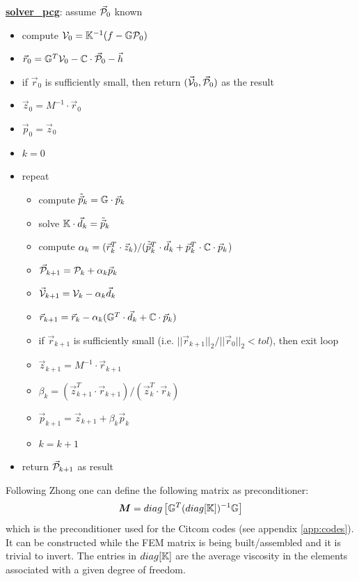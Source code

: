 \begin{mdframed}[backgroundcolor=blue!5]
\underline{\bf solver\_pcg}: assume $\vec{\cal P}_0$ known
\begin{itemize}
\item compute ${\cal V}_0={\mathbb{K}}^{-1}(f-{\mathbb{G}}{\cal P}_0)$
\item $\vec{r}_0 = {\mathbb{G}}^T {\cal V}_0 - {\mathbb{C}} \cdot \vec{\cal P}_0 - \vec{h}$
\item if $\vec{r}_0$ is sufficiently small, then return $(\vec{\cal V}_0,\vec{\cal P}_0)$ as the result
\item $\vec{z}_0= M^{-1} \cdot \vec{r}_0$ 
\item $\vec{p}_0=\vec{z}_0$
\item $k=0$
\item repeat
\begin{itemize}
\item compute $\tilde{\vec{p}}_k = {\mathbb{G}} \cdot \vec{p}_k$
\item solve ${\mathbb{K}}\cdot  \vec{d}_k = \tilde{\vec{p}}_k$
\item compute $\alpha_k=(\vec{r}_k^T \cdot \vec{z}_k)/(\tilde{\vec{p}}_k^T \cdot \vec{d}_k
      + \vec{p}_k^T\cdot{\mathbb{C}} \cdot \vec{p}_k$)
\item $\vec{\cal P}_{k+1} = {\cal P}_k+\alpha_k \vec{p}_k$
\item $\vec{\cal V}_{k+1} = {\cal V}_k - \alpha_k \vec{d}_k$
\item $\vec{r}_{k+1} = \vec{r}_k - \alpha_k ({\mathbb{G}}^T \cdot \vec{d}_k + {\mathbb{C}} \cdot \vec{p}_k) $
\item if $\vec{r}_{k+1}$ is sufficiently small (i.e. $||\vec{r}_{k+1}||_2/||\vec{r}_0||_2 <tol$), 
      then exit loop
\item $\vec{z}_{k+1}=M^{-1} \cdot \vec{r}_{k+1}$
\item $\beta_k=(\vec{z}_{k+1}^T \cdot  \vec{r}_{k+1})/(\vec{z}_k^T \cdot  \vec{r}_k)$
\item $\vec{p}_{k+1} =\vec{z}_{k+1}+ \beta_k \vec{p}_k$
\item $k=k+1$
\end{itemize}
\item return $\vec{\cal P}_{k+1}$ as result
\end{itemize}
\end{mdframed}

Following Zhong \etal \cite{zhym12} one can define the following matrix as preconditioner:
\[
{\bm M} = diag \left[ {\mathbb{G}}^T (diag [{\mathbb{K}}]  )^{-1} {\mathbb{G}} \right]
\]
which is the preconditioner used for the Citcom codes (see appendix \ref{app:codes}). It 
can be constructed while the FEM matrix is being built/assembled
and it is trivial to invert. The entries in
$diag[{\mathbb{K}}]$ are the average viscosity in the elements associated
with a given degree of freedom.


